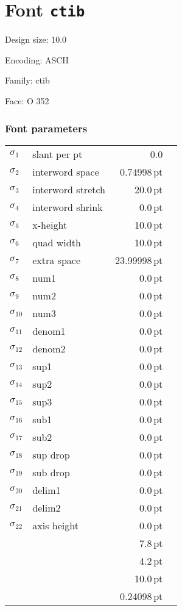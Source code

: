 \documentclass{article}
\newlength{\maxcharwidth}
\begin{document}
\setlength{\maxcharwidth}{193.564pt}
\addtolength{\maxcharwidth}{2\fboxsep}

\section{Font \texttt{ctib}}


Design size: 10.0\,

Encoding: ASCII

Family: ctib

Face: O 352

\subsubsection{Font parameters}

\begin{tabular}{@{}llr@{\quad}l}
$\sigma_1$ & slant per pt & 0.0 \\
$\sigma_2$ & interword space & 0.74998\,pt \\
$\sigma_3$ & interword stretch & 20.0\,pt \\
$\sigma_4$ & interword shrink & 0.0\,pt \\
$\sigma_5$ & x-height & 10.0\,pt \\
$\sigma_6$ & quad width & 10.0\,pt \\
$\sigma_7$ & extra space & 23.99998\,pt \\
$\sigma_8$ & num1 & 0.0\,pt \\
$\sigma_9$ & num2 & 0.0\,pt \\
$\sigma_{10}$ & num3 & 0.0\,pt \\
$\sigma_{11}$ & denom1 & 0.0\,pt \\
$\sigma_{12}$ & denom2 & 0.0\,pt \\
$\sigma_{13}$ & sup1 & 0.0\,pt \\
$\sigma_{14}$ & sup2 & 0.0\,pt \\
$\sigma_{15}$ & sup3 & 0.0\,pt \\
$\sigma_{16}$ & sub1 & 0.0\,pt \\
$\sigma_{17}$ & sub2 & 0.0\,pt \\
$\sigma_{18}$ & sup drop & 0.0\,pt \\
$\sigma_{19}$ & sub drop & 0.0\,pt \\
$\sigma_{20}$ & delim1 & 0.0\,pt \\
$\sigma_{21}$ & delim2 & 0.0\,pt \\
$\sigma_{22}$ & axis height & 0.0\,pt \\
 &  & 7.8\,pt \\
 &  & 4.2\,pt \\
 &  & 10.0\,pt \\
 &  & 0.24098\,pt \\
\end{tabular}
\end{document}
